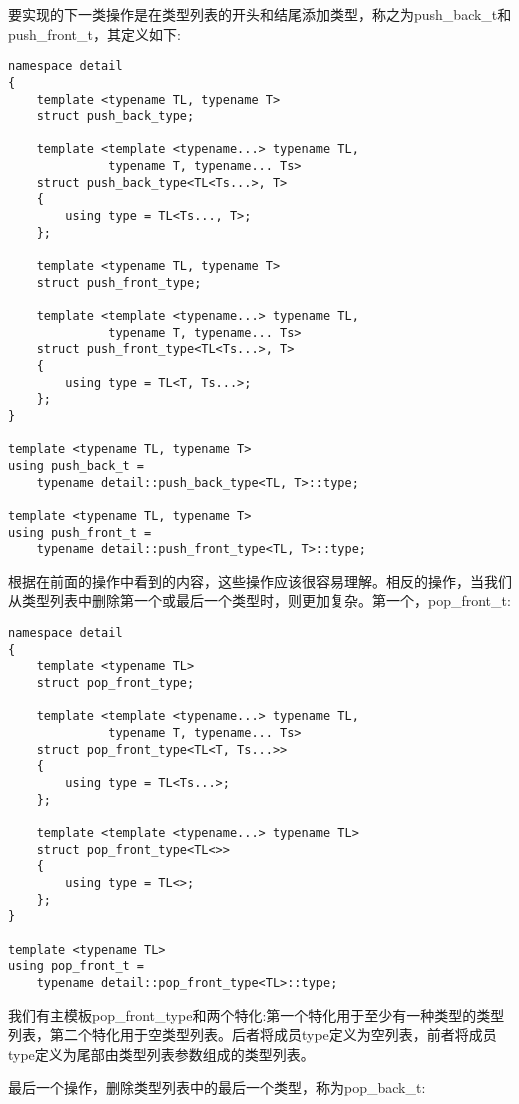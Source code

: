 要实现的下一类操作是在类型列表的开头和结尾添加类型，称之为push\_back\_t和push\_front\_t，其定义如下:

\begin{lstlisting}[style=styleCXX]
namespace detail
{
	template <typename TL, typename T>
	struct push_back_type;
	
	template <template <typename...> typename TL,
			  typename T, typename... Ts>
	struct push_back_type<TL<Ts...>, T>
	{
		using type = TL<Ts..., T>;
	};

	template <typename TL, typename T>
	struct push_front_type;
	
	template <template <typename...> typename TL,
			  typename T, typename... Ts>
	struct push_front_type<TL<Ts...>, T>
	{
		using type = TL<T, Ts...>;
	};
}

template <typename TL, typename T>
using push_back_t =
	typename detail::push_back_type<TL, T>::type;
	
template <typename TL, typename T>
using push_front_t =
	typename detail::push_front_type<TL, T>::type;
\end{lstlisting}

根据在前面的操作中看到的内容，这些操作应该很容易理解。相反的操作，当我们从类型列表中删除第一个或最后一个类型时，则更加复杂。第一个，pop\_front\_t:

\begin{lstlisting}[style=styleCXX]
namespace detail
{
	template <typename TL>
	struct pop_front_type;
	
	template <template <typename...> typename TL,
	          typename T, typename... Ts>
	struct pop_front_type<TL<T, Ts...>>
	{
		using type = TL<Ts...>;
	};

	template <template <typename...> typename TL>
	struct pop_front_type<TL<>>
	{
		using type = TL<>;
	};
}

template <typename TL>
using pop_front_t =
	typename detail::pop_front_type<TL>::type;
\end{lstlisting}

我们有主模板pop\_front\_type和两个特化:第一个特化用于至少有一种类型的类型列表，第二个特化用于空类型列表。后者将成员type定义为空列表，前者将成员type定义为尾部由类型列表参数组成的类型列表。

最后一个操作，删除类型列表中的最后一个类型，称为pop\_back\_t:


